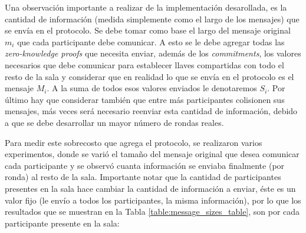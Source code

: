 Una observación importante a realizar de la implementación desarollada, es la 
cantidad de información (medida simplemente como el largo de los mensajes) que 
se envía en el protocolo. Se debe tomar como base el largo del mensaje 
original $m_i$ que cada participante debe comunicar. A esto se le debe agregar 
todas las \emph{zero-knowledge proofs} que necesita enviar, además de los \emph
{commitments}, los valores necesarios que debe comunicar para establecer 
llaves compartidas con todo el resto de la sala y considerar que en realidad 
lo que se envía en el protocolo es el mensaje $M_i$. A la suma de todos esos 
valores enviados le denotaremos $S_i$. Por último hay que considerar también 
que entre más participantes colisionen sus mensajes, más veces será necesario 
reenviar esta cantidad de información, debido a que se debe desarrollar un 
mayor número de rondas reales.

Para medir este sobrecosto que agrega el protocolo, se realizaron varios 
experimentos, donde se varió el tamaño del mensaje original que desea 
comunicar cada participante y se observó cuanta información se enviaba 
finalmente (por ronda) al resto de la sala. Importante notar que la cantidad 
de participantes presentes en la sala hace cambiar la cantidad de información a 
enviar, éste es un valor fijo (le envío a todos los participantes, la misma 
información), por lo que los resultados que se muestran en la Tabla \ref{table:message_sizes_table}, 
son por cada participante presente en la sala:

